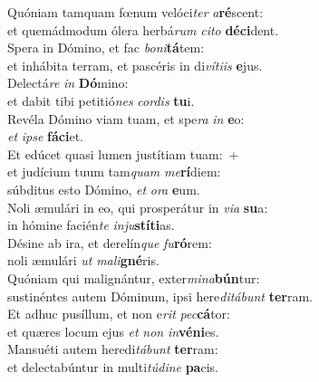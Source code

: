 \evenverse Quóniam tamquam fœnum velóci\textit{ter} \textit{a}\textbf{ré}scent:~\*\\
\evenverse et quemádmodum ólera herbá\textit{rum} \textit{ci}\textit{to} \textbf{dé}\textbf{ci}dent.\\
\oddverse Spera in Dómino, et fac \textit{bo}\textit{ni}\textbf{tá}tem:~\*\\
\oddverse et inhábita terram, et pascéris in di\textit{ví}\textit{ti}\textit{is} \textbf{e}jus.\\
\evenverse Delectá\textit{re} \textit{in} \textbf{Dó}mino:~\*\\
\evenverse et dabit tibi petitió\textit{nes} \textit{cor}\textit{dis} \textbf{tu}i.\\
\oddverse Revéla Dómino viam tuam, et spe\textit{ra} \textit{in} \textbf{e}o:~\*\\
\oddverse \textit{et} \textit{i}\textit{pse} \textbf{fá}\textbf{ci}et.\\
\evenverse Et edúcet quasi lumen justítiam tuam:~+\\
\evenverse  et judícium tuum tam\textit{quam} \textit{me}\textbf{rí}diem:~\*\\
\evenverse súbditus esto Dómino, \textit{et} \textit{o}\textit{ra} \textbf{e}um.\\
\oddverse Noli æmulári in eo, qui prosperátur in \textit{vi}\textit{a} \textbf{su}a:~\*\\
\oddverse in hómine facién\textit{te} \textit{in}\textit{ju}\textbf{stí}\textbf{ti}as.\\
\evenverse Désine ab ira, et derelín\textit{que} \textit{fu}\textbf{ró}rem:~\*\\
\evenverse noli æmulári \textit{ut} \textit{ma}\textit{li}\textbf{gné}ris.\\
\oddverse Quóniam qui malignántur, exter\textit{mi}\textit{na}\textbf{bún}tur:~\*\\
\oddverse sustinéntes autem Dóminum, ipsi here\textit{di}\textit{tá}\textit{bunt} \textbf{ter}ram.\\
\evenverse Et adhuc pusíllum, et non e\textit{rit} \textit{pec}\textbf{cá}tor:~\*\\
\evenverse et quæres locum ejus \textit{et} \textit{non} \textit{in}\textbf{vé}\textbf{ni}es.\\
\oddverse Mansuéti autem heredi\textit{tá}\textit{bunt} \textbf{ter}ram:~\*\\
\oddverse et delectabúntur in multi\textit{tú}\textit{di}\textit{ne} \textbf{pa}cis.\\
